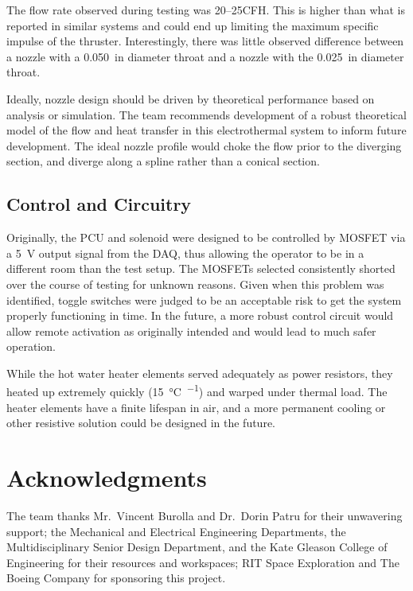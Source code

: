 \documentclass[journal]{IEEEtran}
\begin{document}
The flow rate observed during testing was 20--25\si{CFH}.
This is higher than what is reported in similar systems and could end up limiting the maximum specific impulse of the thruster.
Interestingly, there was little observed difference between a nozzle with a \SI{.050}{in} diameter throat and a nozzle with the \SI{.025}{in} diameter throat.

Ideally, nozzle design should be driven by theoretical performance based on analysis or simulation.
The team recommends development of a robust theoretical model of the flow and heat transfer in this electrothermal system to inform future development.
The ideal nozzle profile would choke the flow prior to the diverging section, and diverge along a spline rather than a conical section.


\subsection{Control and Circuitry}
Originally, the PCU and solenoid were designed to be controlled by MOSFET via a \SI{5}{\volt} output signal from the DAQ, thus allowing the operator to be in a different room than the test setup.
The MOSFETs selected consistently shorted over the course of testing for unknown reasons.
Given when this problem was identified, toggle switches were judged to be an acceptable risk to get the system properly functioning in time.
In the future, a more robust control circuit would allow remote activation as originally intended and would lead to much safer operation.

While the hot water heater elements served adequately as power resistors, they heated up extremely quickly (\SI{15}{\celsius\per\sec}) and warped under thermal load.
The heater elements have a finite lifespan in air, and a more permanent cooling or other resistive solution could be designed in the future.


\section*{Acknowledgments}
The team thanks Mr.~Vincent Burolla and Dr.~Dorin Patru for their unwavering support; the Mechanical and Electrical Engineering Departments, the Multidisciplinary Senior Design Department, and the Kate Gleason College of Engineering for their resources and workspaces; RIT Space Exploration and The Boeing Company for sponsoring this project.
\end{document}

